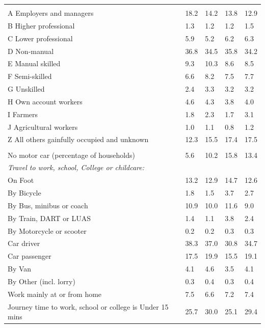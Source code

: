 \documentclass{article}
\begin{document}
\begin{table}[h]
\begin{tabular}{KTTTT}
\hline
    \\ 
    \hline
A Employers and managers & 18.2& 14.2& 13.8& 12.9\\
B Higher professional & 1.3& 1.2& 1.2& 1.5\\
C Lower professional & 5.9& 5.2& 6.2& 6.3\\
D Non-manual & 36.8& 34.5& 35.8& 34.2\\
E Manual skilled &  9.3& 10.3&  8.6&  8.5\\
F Semi-skilled & 6.6& 8.2& 7.5& 7.7\\
G Unskilled & 2.4& 3.3& 3.2& 3.2\\
H Own account workers & 4.6& 4.3& 3.8& 4.0\\
I Farmers & 1.8& 2.3& 1.7& 3.1\\
J Agricultural workers & 1.0& 1.1& 0.8& 1.2\\
Z All others gainfully occupied and unknown & 12.3& 15.5& 17.4& 17.5\\
\hline
{}\hline
    \\ 
    \hline
No motor car (percentage of households) &  5.6& 10.2& 15.8& 
13.4\\
    \hline 
\emph{Travel to work, school, College or childcare:} & & & \\
\quad On Foot & 13.2& 12.9& 14.7& 12.6\\ 
\quad By Bicycle & 1.8& 1.5& 3.7& 2.7\\ 
\quad By Bus, minibus or coach & 10.9& 10.0& 11.6&  9.0\\
\quad By Train, DART or LUAS & 1.4& 1.1& 3.8& 2.4\\
\quad By Motorcycle or scooter & 0.2& 0.2& 0.3& 0.3\\
\quad Car driver & 38.3 & 37.0& 30.8& 34.7\\
\quad Car passenger & 17.5& 19.9& 15.5& 19.1\\
\quad By Van & 4.1& 4.6& 3.5& 4.1\\
\quad By Other (incl. lorry) & 0.3& 0.4& 0.3& 0.4\\
    \hline
Work mainly at or from home & 7.5& 6.6& 7.2& 7.4\\
Journey time to work, school or college is Under 15 mins & 25.7& 30.0& 25.1& 29.4\\

\end{tabular}
\end{table}
\end{document}
